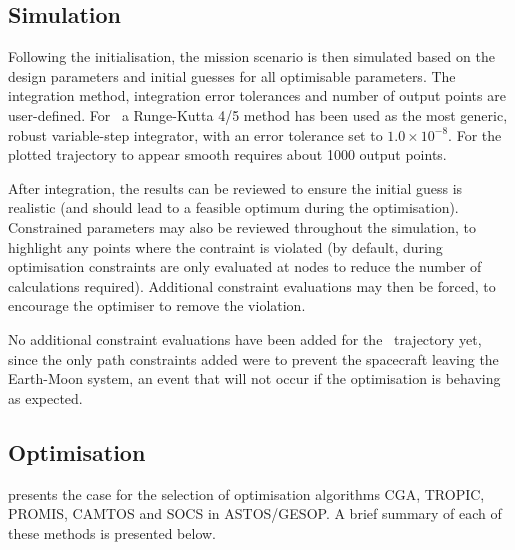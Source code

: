\subsection{Simulation} \label{sub:ASTOS-Simulation}

Following the initialisation, the mission scenario is then simulated based on the design parameters and initial guesses for all optimisable parameters. The integration method, integration error tolerances and number of output points are user-defined. For \BW\ a Runge-Kutta 4/5 method has been used as the most generic, robust variable-step integrator, with an error tolerance set to $1.0\times10^{-8}$. For the plotted trajectory to appear smooth requires about 1000 output
 points.

After integration, the results can be reviewed to ensure the initial guess is realistic (and should lead to a feasible optimum during the optimisation). Constrained parameters may also be reviewed throughout the simulation, to highlight any points where the contraint is violated (by default, during optimisation constraints are only evaluated at nodes to reduce the number of calculations required). Additional constraint evaluations may then be forced, to encourage the optimiser to remove the violation.

No additional constraint evaluations have been added for the \BW\ trajectory yet, since the only path constraints added were to prevent the spacecraft leaving the Earth-Moon system, an event that will not occur if the optimisation is behaving as expected.

\subsection{Optimisation} \label{sub:ASTOS-Optimisation}

\textcite{ASTOS_guide} presents the case for the selection of optimisation algorithms CGA, TROPIC, PROMIS, CAMTOS and SOCS in ASTOS/GESOP. A brief summary of each of these methods is presented below.

